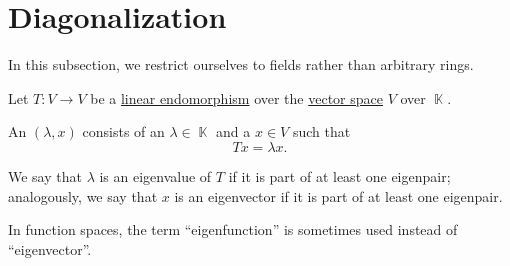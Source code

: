 \section{Diagonalization}\label{sec:diagonalization}

In this subsection, we restrict ourselves to fields rather than arbitrary rings.

\begin{definition}\label{def:eigenpair}
  Let \( T: V \to V \) be a \hyperref[def:linear_function]{linear endomorphism} over the \hyperref[def:vector_space]{vector space} \( V \) over \( \BbbK \).

  An  \( (\lambda, x) \) consists of an  \( \lambda \in \BbbK \) and a   \( x \in V \) such that
  \begin{equation*}
    Tx = \lambda x.
  \end{equation*}

  We say that \( \lambda \) is an eigenvalue of \( T \) if it is part of at least one eigenpair; analogously, we say that \( x \) is an eigenvector if it is part of at least one eigenpair.

  In function spaces, the term \enquote{eigenfunction} is sometimes used instead of \enquote{eigenvector}.
\end{definition}

